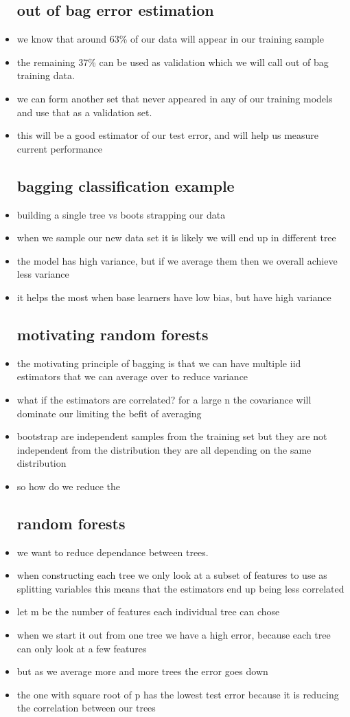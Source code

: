 \documentclass{article}
\begin{document}
\begin{itemize}
\subsection*{out of bag error estimation}
\item we know that around 63\% of our data will appear in our training sample 
\item the remaining 37\% can be used as validation which we will call out of bag training data. 
\item we can form another set that never appeared in any of our training models and use that as a validation set. 
\item this will be a good estimator of our test error, and will help us measure current performance
\subsection*{bagging classification example}
\item building a single tree vs boots strapping our data 
\item  when we sample our new data set it is likely we will end up in different tree 
\item the model has high variance, but if we average them then we overall achieve less variance
\item it helps the most when base learners have low bias, but have high variance
\subsection*{motivating random forests}
\item the motivating principle of bagging is that we can have multiple iid estimators that we can 
average over to reduce variance 
\item what if the estimators are correlated? for a large n the covariance will dominate our limiting the befit of averaging 
\item bootstrap are independent samples from the training set but they are not independent from the distribution they are all depending on the same distribution
\item so how do we reduce the
\subsection*{random forests}
\item we want to reduce dependance between trees. 
\item when constructing each tree we only look at a subset of features to use as splitting variables this means that the estimators end up being 
less correlated
\item let m be the number of features each individual tree can chose
\item when we start it out from one tree we have a high error, because each tree can only look at a few features
\item but as we average more and more trees the error goes down 
\item the one with square root of p has the lowest test error because it is reducing the correlation between our trees

\end{itemize}
\end{document}
